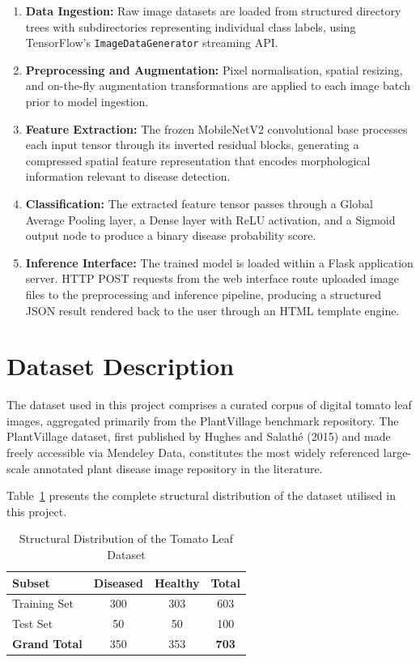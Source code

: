 \documentclass[12pt,a4paper]{report}
\begin{document}
\begin{enumerate}[label=\textbf{Stage \arabic*:}, leftmargin=*, itemsep=6pt]
    \item \textbf{Data Ingestion:} Raw image datasets are loaded from structured directory trees with subdirectories representing individual class labels, using TensorFlow's \texttt{ImageDataGenerator} streaming API.
    \item \textbf{Preprocessing and Augmentation:} Pixel normalisation, spatial resizing, and on-the-fly augmentation transformations are applied to each image batch prior to model ingestion.
    \item \textbf{Feature Extraction:} The frozen MobileNetV2 convolutional base processes each input tensor through its inverted residual blocks, generating a compressed spatial feature representation that encodes morphological information relevant to disease detection.
    \item \textbf{Classification:} The extracted feature tensor passes through a Global Average Pooling layer, a Dense layer with ReLU activation, and a Sigmoid output node to produce a binary disease probability score.
    \item \textbf{Inference Interface:} The trained model is loaded within a Flask application server. HTTP POST requests from the web interface route uploaded image files to the preprocessing and inference pipeline, producing a structured JSON result rendered back to the user through an HTML template engine.
\end{enumerate}

\section{Dataset Description}

The dataset used in this project comprises a curated corpus of digital tomato leaf images, aggregated primarily from the PlantVillage benchmark repository. The PlantVillage dataset, first published by Hughes and Salath\'{e} (2015) and made freely accessible via Mendeley Data, constitutes the most widely referenced large-scale annotated plant disease image repository in the literature.

Table~\ref{tab:dataset} presents the complete structural distribution of the dataset utilised in this project.

\begin{table}[H]
\centering
\caption{Structural Distribution of the Tomato Leaf Dataset}
\label{tab:dataset}
\begin{tabular}{lccc}
\toprule
\textbf{Subset}     & \textbf{Diseased} & \textbf{Healthy} & \textbf{Total} \\
\midrule
Training Set        & 300               & 303              & 603            \\
Test Set            & 50                & 50               & 100            \\
\midrule
\textbf{Grand Total}& 350               & 353              & \textbf{703}   \\
\bottomrule
\end{tabular}
\end{table}
\end{document}
